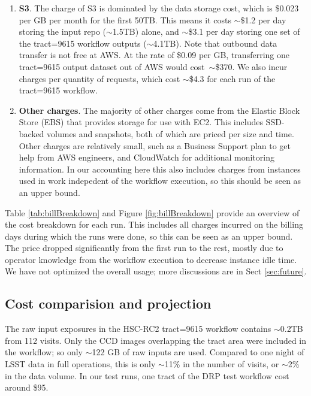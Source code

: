 \begin{enumerate}
\item \textbf{S3}.
The charge of S3 is dominated by the data storage cost, which is \$0.023 per GB per month for the first 50TB.
This means it costs $\sim$\$1.2 per day storing the input repo ($\sim$1.5TB) alone, and $\sim$\$3.1 per day storing one set of the tract=9615 workflow outputs ($\sim$4.1TB).
Note that outbound data transfer is not free at AWS.
At the rate of \$0.09 per GB, transferring one tract=9615 output dataset out of AWS would cost~$\sim$\$370.
We also incur charges per quantity of requests, which cost $\sim$\$4.3 for each run of the tract=9615 workflow.

\item \textbf{Other charges}.
The majority of other charges come from the Elastic Block Store (EBS) that provides storage for use with EC2.
This includes SSD-backed volumes and snapshots, both of which are priced per size and time.
Other charges are relatively small, such as a Business Support plan to get help from AWS engineers, and CloudWatch for additional monitoring information.
In our accounting here this also includes charges from instances used in work indepedent of the workflow execution, so this should be seen as an upper bound.

\end{enumerate}

Table \ref{tab:billBreakdown} and Figure \ref{fig:billBreakdown} provide an overview of the cost breakdown for each run.
This includes all charges incurred on the billing days during which the runs were done, so this can be seen as an upper bound.
The price dropped significantly from the first run to the rest, mostly due to operator knowledge from the workflow execution to decrease instance idle time.
We have not optimized the overall usage; more discussions are in Sect \ref{sec:future}.



\subsection{Cost comparision and projection}

The raw input exposures in the HSC-RC2 tract=9615 workflow contains $\sim$0.2TB from 112 visits.
Only the CCD images overlapping the tract area were included in the workflow; so only $\sim$122 GB of raw inputs are used.
Compared to one night of LSST data in full operations, this is only $\sim$11\% in the number of visits, or $\sim$2\% in the data volume.
In our test runs, one tract of the DRP test workflow cost around \$95.

